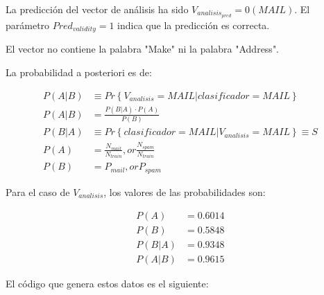 \documentclass[11pt]{article} %
\begin{document}
La predicción del vector de análisis ha sido $V_{analisis_{pred}} = 0 (MAIL)$. El parámetro $Pred_{validity} = 1$ indica que la predicción es correcta.

El vector no contiene la palabra "Make" ni la palabra "Address".

\newpage

La probabilidad a posteriori es de:

\begin{equation}
	\begin{aligned}
		P\left(A | B\right) &\equiv Pr \left\lbrace V_{analisis}=MAIL | clasificador=MAIL \right\rbrace \\
		P\left(A | B\right) &= \frac{P \left( B | A \right) \cdot P \left( A \right)}{P \left( B \right)} \\
		P \left( B | A \right) & \equiv Pr \left\lbrace clasificador=MAIL | V_{analisis}=MAIL \right\rbrace \equiv S\\
		P \left( A \right) &= \frac{N_{mail}}{N_{train}}, or \frac{N_{spam}}{N_{train}} \\
		P \left( B \right) &= P_{mail} , or P_{spam}
	\end{aligned}
\end{equation}

Para el caso de $V_{analisis}$, los valores de las probabilidades son:

\begin{align}
	P \left( A \right) &= 0.6014 \\
	P \left( B \right) &= 0.5848 \\
	P \left( B | A \right) &= 0.9348 \\
	P\left(A | B\right) &= 0.9615
\end{align}

El código que genera estos datos es el siguiente:


\end{document}
